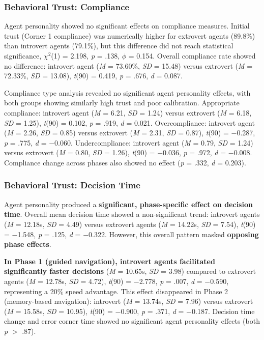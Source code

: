 \documentclass[12pt]{article}
\begin{document}
\subsubsection{Behavioral Trust: Compliance}

Agent personality showed no significant effects on compliance measures. Initial trust (Corner 1 compliance) was numerically higher for extrovert agents (89.8\%) than introvert agents (79.1\%), but this difference did not reach statistical significance, $\chi^2$(1) = 2.198, \textit{p} = .138, $\phi$ = 0.154. Overall compliance rate showed no difference: introvert agent (\textit{M} = 73.60\%, \textit{SD} = 15.48) versus extrovert (\textit{M} = 72.33\%, \textit{SD} = 13.08), \textit{t}(90) = 0.419, \textit{p} = .676, \textit{d} = 0.087.

Compliance type analysis revealed no significant agent personality effects, with both groups showing similarly high trust and poor calibration. Appropriate compliance: introvert agent (\textit{M} = 6.21, \textit{SD} = 1.24) versus extrovert (\textit{M} = 6.18, \textit{SD} = 1.25), \textit{t}(90) = 0.102, \textit{p} = .919, \textit{d} = 0.021. Overcompliance: introvert agent (\textit{M} = 2.26, \textit{SD} = 0.85) versus extrovert (\textit{M} = 2.31, \textit{SD} = 0.87), \textit{t}(90) = $-$0.287, \textit{p} = .775, \textit{d} = $-$0.060. Undercompliance: introvert agent (\textit{M} = 0.79, \textit{SD} = 1.24) versus extrovert (\textit{M} = 0.80, \textit{SD} = 1.26), \textit{t}(90) = $-$0.036, \textit{p} = .972, \textit{d} = $-$0.008. Compliance change across phases also showed no effect (\textit{p} = .332, \textit{d} = 0.203).

\subsubsection{Behavioral Trust: Decision Time}

Agent personality produced a \textbf{significant, phase-specific effect on decision time}. Overall mean decision time showed a non-significant trend: introvert agents (\textit{M} = 12.18s, \textit{SD} = 4.49) versus extrovert agents (\textit{M} = 14.22s, \textit{SD} = 7.54), \textit{t}(90) = $-$1.548, \textit{p} = .125, \textit{d} = $-$0.322. However, this overall pattern masked \textbf{opposing phase effects}.

\textbf{In Phase 1 (guided navigation), introvert agents facilitated significantly faster decisions} (\textit{M} = 10.65s, \textit{SD} = 3.98) compared to extrovert agents (\textit{M} = 12.78s, \textit{SD} = 4.72), \textit{t}(90) = $-$2.778, \textit{p} = .007, \textit{d} = $-$0.590, representing a 20\% speed advantage. This effect disappeared in Phase 2 (memory-based navigation): introvert (\textit{M} = 13.74s, \textit{SD} = 7.96) versus extrovert (\textit{M} = 15.58s, \textit{SD} = 10.95), \textit{t}(90) = $-$0.900, \textit{p} = .371, \textit{d} = $-$0.187. Decision time change and error corner time showed no significant agent personality effects (both \textit{p} $>$ .87).
\end{document}
